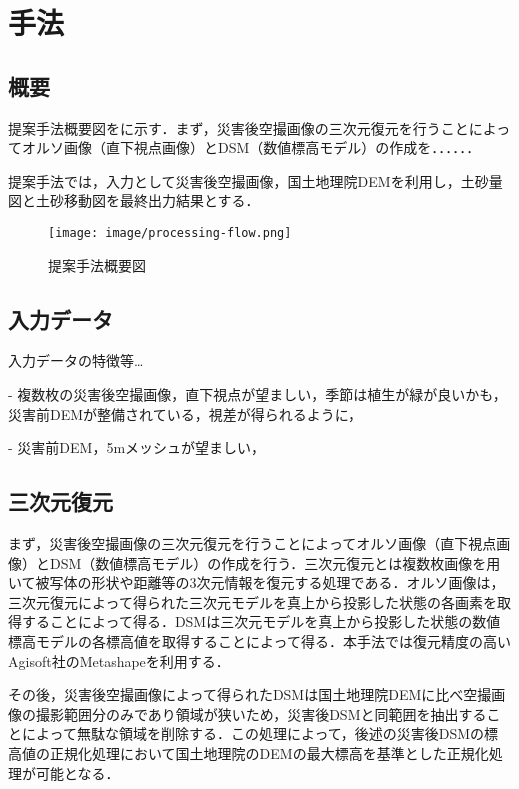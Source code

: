 \chapter{手法}
  \section{概要}
    提案手法概要図をに示す．まず，災害後空撮画像の三次元復元を行うことによってオルソ画像（直下視点画像）とDSM（数値標高モデル）の作成を．．．．．．

    提案手法では，入力として災害後空撮画像，国土地理院DEMを利用し，土砂量図と土砂移動図を最終出力結果とする．

    \begin{figure}[t]
      \centering
      \texttt{[image: image/processing-flow.png]}
      \caption{提案手法概要図}
      \label{提案手法概要図}
    \end{figure}


  \section{入力データ}
    \label{入力データ}
    入力データの特徴等\dots

    - 複数枚の災害後空撮画像，直下視点が望ましい，季節は植生が緑が良いかも，災害前DEMが整備されている，視差が得られるように，

    - 災害前DEM，5mメッシュが望ましい，



  \section{三次元復元}
    まず，災害後空撮画像の三次元復元を行うことによってオルソ画像（直下視点画像）とDSM（数値標高モデル）の作成を行う．三次元復元とは複数枚画像を用いて被写体の形状や距離等の3次元情報を復元する処理である．オルソ画像は，三次元復元によって得られた三次元モデルを真上から投影した状態の各画素を取得することによって得る．DSMは三次元モデルを真上から投影した状態の数値標高モデルの各標高値を取得することによって得る．本手法では復元精度の高いAgisoft社のMetashape\cite{使用手法1}を利用する．

    その後，災害後空撮画像によって得られたDSMは国土地理院DEMに比べ空撮画像の撮影範囲分のみであり領域が狭いため，災害後DSMと同範囲を抽出することによって無駄な領域を削除する．この処理によって，後述の災害後DSMの標高値の正規化処理において国土地理院のDEMの最大標高を基準とした正規化処理が可能となる．
  
